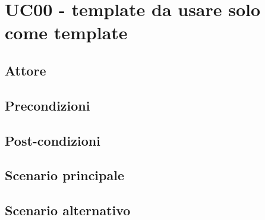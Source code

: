 \section{UC00 - template da usare solo come template}


\subsection{Attore}
\subsection{Precondizioni}
\subsection{Post-condizioni}
\subsection{Scenario principale}
\subsection{Scenario alternativo}